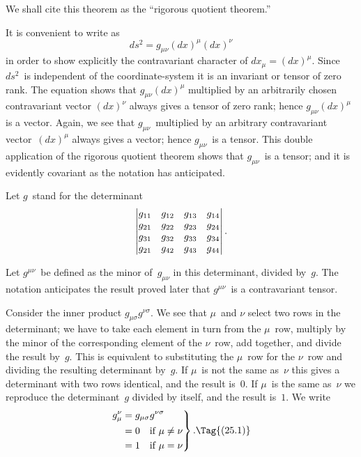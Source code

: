 \documentclass[12pt]{book}
\begin{document}
We shall cite this theorem as the ``rigorous quotient theorem.''

%

It is convenient to write  as
\[
ds^{2} = g_{\mu\nu} (dx)^{\mu} (dx)^{\nu}
\]
in order to show explicitly the contravariant character of $dx_{\mu} = (dx)^{\mu}$. Since
$ds^{2}$~is independent of the coordinate-system it is an invariant or tensor
of zero rank. The equation shows that $g_{\mu\nu} (dx)^{\mu}$ multiplied by an arbitrarily
chosen contravariant vector $(dx)^{\nu}$ always gives a tensor of zero rank; hence
$g_{\mu\nu} (dx)^{\mu}$ is a vector. Again, we see that $g_{\mu\nu}$~multiplied by an arbitrary contravariant
vector~$(dx)^{\mu}$ always gives a vector; hence $g_{\mu\nu}$~is a tensor. This
double application of the rigorous quotient theorem shows that $g_{\mu\nu}$~is a
tensor; and it is evidently covariant as the notation has anticipated.

Let $g$~stand for the determinant
\[
\left\lvert
\begin{array}{@{}cccc@{}}
  g_{11} & g_{12} & g_{13} & g_{14} \\
  g_{21} & g_{22} & g_{23} & g_{24} \\
  g_{31} & g_{32} & g_{33} & g_{34} \\
  g_{21} & g_{42} & g_{43} & g_{44} \\
\end{array}\right\rvert.
\]

Let $g^{\mu\nu}$~be defined as the minor of~$g_{\mu\nu}$ in this determinant, divided by~$g$\footnotemark.\footnotetext
  {The notation anticipates the result proved later that $g^{\mu\nu}$~is a contravariant tensor.}

Consider the inner product $g_{\mu\sigma} g^{\nu\sigma}$. We see that $\mu$~and $\nu$ select two rows
in the determinant; we have to take each element in turn from the $\mu$~row,
multiply by the minor of the corresponding element of the $\nu$~row, add
together, and divide the result by~$g$. This is equivalent to substituting the
$\mu$~row for the $\nu$~row and dividing the resulting determinant by~$g$. If $\mu$~is not
the same as~$\nu$ this gives a determinant with two rows identical, and the
result is~$0$. If $\mu$~is the same as~$\nu$ we reproduce the determinant~$g$ divided by
itself, and the result is~$1$. We write
\[
\left.
\begin{aligned}
  g_{\mu}^{\nu} &= g_{\mu\sigma} g^{\nu\sigma} \\
  &= 0 \quad\text{if $\mu \neq \nu$} \\
  &= 1 \quad\text{if $\mu = \nu$}
\end{aligned}
\right\}.
\Tag{(25.1)}
\]
\end{document}
